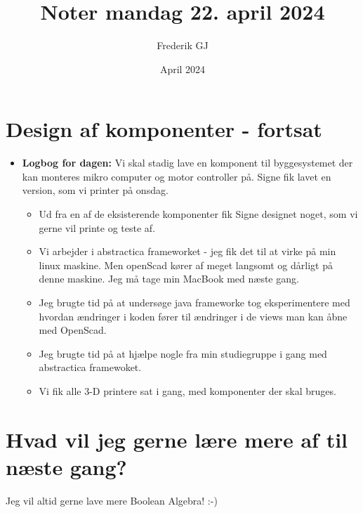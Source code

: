 \documentclass{article}
\title{Noter mandag 22. april 2024}
\author{Frederik GJ}
\date{April 2024}
\begin{document}
\maketitle

\section{Design af komponenter - fortsat}

\begin{itemize}
    \item \textbf{Logbog for dagen:} Vi skal stadig lave en komponent til byggesystemet der kan monteres mikro computer og motor controller på. Signe fik lavet en version, som vi printer på onsdag.
    \begin{itemize}
        \item Ud fra en af de eksisterende komponenter fik Signe designet noget, som vi gerne vil printe og teste af. 
        \item Vi arbejder i abstractica frameworket - jeg fik det til at virke på min linux maskine. Men openScad kører af meget langsomt og dårligt på denne maskine. Jeg må tage min MacBook med næste gang. 
        \item Jeg brugte tid på at undersøge java frameworke tog eksperimentere med hvordan ændringer i koden fører til ændringer i de views man kan åbne med OpenScad.
        \item Jeg brugte tid på at hjælpe nogle fra min studiegruppe i gang med abstractica framewoket. 
        \item Vi fik alle 3-D printere sat i gang, med komponenter der skal bruges.  
    \end{itemize}
\end{itemize}

\section{Hvad vil jeg gerne lære mere af til næste gang?}
Jeg vil altid gerne lave mere Boolean Algebra! :-)
\end{document}

